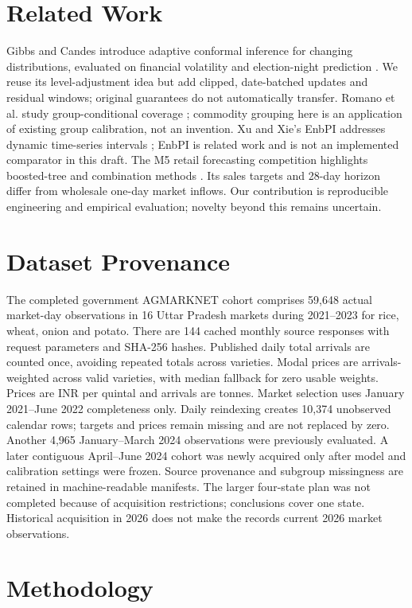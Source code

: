 \documentclass[conference]{IEEEtran}
\begin{document}
\section{Related Work}
Gibbs and Candes introduce adaptive conformal inference for changing distributions, evaluated on financial volatility and election-night prediction \cite{gibbs2021}. We reuse its level-adjustment idea but add clipped, date-batched updates and residual windows; original guarantees do not automatically transfer. Romano et al. study group-conditional coverage \cite{romano2020}; commodity grouping here is an application of existing group calibration, not an invention. Xu and Xie's EnbPI addresses dynamic time-series intervals \cite{xu2021}; EnbPI is related work and is not an implemented comparator in this draft. The M5 retail forecasting competition highlights boosted-tree and combination methods \cite{makridakis2022}. Its sales targets and 28-day horizon differ from wholesale one-day market inflows. Our contribution is reproducible engineering and empirical evaluation; novelty beyond this remains uncertain.
\section{Dataset Provenance}
The completed government AGMARKNET cohort comprises 59,648 actual market-day observations in 16 Uttar Pradesh markets during 2021--2023 for rice, wheat, onion and potato. There are 144 cached monthly source responses with request parameters and SHA-256 hashes. Published daily total arrivals are counted once, avoiding repeated totals across varieties. Modal prices are arrivals-weighted across valid varieties, with median fallback for zero usable weights. Prices are INR per quintal and arrivals are tonnes. Market selection uses January 2021--June 2022 completeness only. Daily reindexing creates 10,374 unobserved calendar rows; targets and prices remain missing and are not replaced by zero. Another 4,965 January--March 2024 observations were previously evaluated. A later contiguous April--June 2024 cohort was newly acquired only after model and calibration settings were frozen.
Source provenance and subgroup missingness are retained in machine-readable manifests. The larger four-state plan was not completed because of acquisition restrictions; conclusions cover one state. Historical acquisition in 2026 does not make the records current 2026 market observations.
\section{Methodology}
\end{document}
